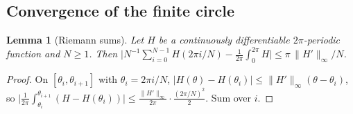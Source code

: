 \documentclass[11pt]{article}
\newtheorem{lemma}{Lemma}[section]
\theoremstyle{definition}
\newcommand{\abs}[1]{\lvert #1\rvert}
\begin{document}
\subsection{Convergence of the finite circle}
\begin{lemma}[Riemann sums]\label{lem:riemann}
Let $H$ be a continuously differentiable $2\pi$-periodic function and $N\ge1$. Then
$\bigl\lvert N^{-1}\sum_{i=0}^{N-1}H(2\pi i/N)-\frac1{2\pi}\int_0^{2\pi}H\bigr\rvert\le\pi\,\|H'\|_\infty/N$.
\end{lemma}
\begin{proof}
On $[\theta_i,\theta_{i+1}]$ with $\theta_i=2\pi i/N$, $\abs{H(\theta)-H(\theta_i)}\le\|H'\|_\infty(\theta-\theta_i)$, so
$\bigl\lvert\frac1{2\pi}\int_{\theta_i}^{\theta_{i+1}}(H-H(\theta_i))\bigr\rvert\le\frac{\|H'\|_\infty}{2\pi}\cdot\frac{(2\pi/N)^2}{2}$.
Sum over $i$.
\end{proof}
\end{document}
